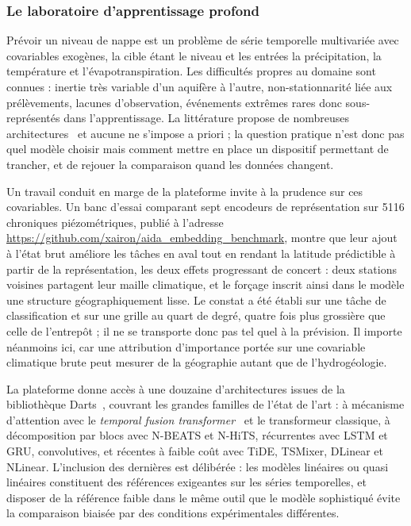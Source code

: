 \subsubsection{Le laboratoire d'apprentissage profond}

Prévoir un niveau de nappe est un problème de série temporelle multivariée avec covariables exogènes, la cible étant le niveau et les entrées la précipitation, la température et l'évapotranspiration. Les difficultés propres au domaine sont connues : inertie très variable d'un aquifère à l'autre, non-stationnarité liée aux prélèvements, lacunes d'observation, événements extrêmes rares donc sous-représentés dans l'apprentissage. La littérature propose de nombreuses architectures~\cite{petropoulos2022forecasting, kong2025deep, wang2024deep} et aucune ne s'impose a priori ; la question pratique n'est donc pas quel modèle choisir mais comment mettre en place un dispositif permettant de trancher, et de rejouer la comparaison quand les données changent.

Un travail conduit en marge de la plateforme invite à la prudence sur ces covariables. Un banc d'essai comparant sept encodeurs de représentation sur \num{5116} chroniques piézométriques, publié à l'adresse \url{https://github.com/xairon/aida_embedding_benchmark}, montre que leur ajout à l'état brut améliore les tâches en aval tout en rendant la latitude prédictible à partir de la représentation, les deux effets progressant de concert : deux stations voisines partagent leur maille climatique, et le forçage inscrit ainsi dans le modèle une structure géographiquement lisse. Le constat a été établi sur une tâche de classification et sur une grille au quart de degré, quatre fois plus grossière que celle de l'entrepôt ; il ne se transporte donc pas tel quel à la prévision. Il importe néanmoins ici, car une attribution d'importance portée sur une covariable climatique brute peut mesurer de la géographie autant que de l'hydrogéologie.

La plateforme donne accès à une douzaine d'architectures issues de la bibliothèque Darts~\cite{darts}, couvrant les grandes familles de l'état de l'art : à mécanisme d'attention avec le \emph{temporal fusion transformer}~\cite{lim2021tft} et le transformeur classique, à décomposition par blocs avec N-BEATS et N-HiTS, récurrentes avec LSTM et GRU, convolutives, et récentes à faible coût avec TiDE, TSMixer, DLinear et NLinear. L'inclusion des dernières est délibérée : les modèles linéaires ou quasi linéaires constituent des références exigeantes sur les séries temporelles, et disposer de la référence faible dans le même outil que le modèle sophistiqué évite la comparaison biaisée par des conditions expérimentales différentes.

